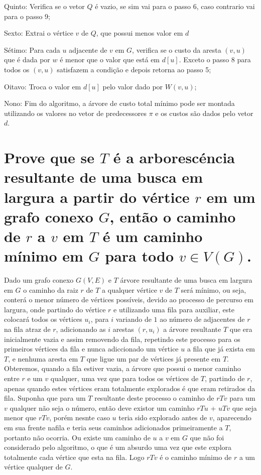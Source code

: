 \documentclass[final,3p,12pt]{elsarticle}
\begin{document}
			Quinto:
			Verifica se o vetor $Q$ é vazio, se sim vai para o passo 6, caso contrario vai para o passo 9;
			
			Sexto:
			Extrai o vértice $v$ de $Q$, que possui menos valor em $d$

			Sétimo:
			Para cada $u$ adjacente de $v$ em $G$, verifica se o custo da aresta $(v,u)$ que é dada por $w$ é menor que o valor que está em $d[u]$. Exceto o passo 8 para todos os $(v,u)$ satisfazem a condição e depois retorna ao passo 5;

			Oitavo:
			Troca o valor em $d[u]$ pelo valor dado por $W(v,u)$;

			Nono:
			Fim do algoritmo, a árvore de custo total mínimo pode ser montada utilizando os valores no vetor de predecessores $\pi$ e os custos são dados pelo vetor $d$.

\section{Prove que se $T$ é a arborescéncia resultante de uma busca em largura a partir do vértice $r$ em um grafo conexo $G$, então o caminho de $r$ a $v$ em $T$ é um caminho mínimo em $G$ para todo $v \in V(G)$.}
	\label{S:4}
		Dado um grafo conexo $G(V,E)$ e $T$ árvore resultante de uma busca em largura em $G$ o caminho da raiz $r$ de $T$ a qualquer vértice $v$ de $T$ será mínimo, ou seja, conterá o menor número de vértices possíveis, devido ao processo de percurso em largura, onde partindo do vértice $r$ e utilizando uma fila para auxiliar, este colocará todos os vértices $u_i$, para $i$ variando de $1$ ao número de adjacentes de $r$ na fila atraz de $r$, adicionando as $i$ arestas $(r,u_i)$ a árvore resultante $T$ que era inicialmente vazia e assim removendo da fila, repetindo este processo para os primeiros vértices da fila e nunca adiccionado um vértice $u$ a fila que já exista em $T$, e nenhuma aresta em $T$ que ligue um par de vértices já presente em $T$. Obteremos, quando a fila estiver vazia, a árvore que possui o menor caminho entre $r$ e um $v$ qualquer, uma vez que para todos os vértices de $T$, partindo de $r$, apenas quando estes vértices eram totalmente explorados é que eram retirados da fila.
		Suponha que para um $T$ resultante deste processo o caminho de $rTv$ para um $v$ qualquer não seja o número, então deve existor um caminho $rTu$ + $uTv$ que seja menor que $rTv$, porém nesnte caso $u$ teria sido explorado antes de $v$, aparecendo em sua frente nafila e teria seus caminhos adicionados primeiramente a $T$, portanto não ocorria. Ou existe um caminho de $u$ a $v$ em $G$ que não foi considerado pelo algoritmo, o que é um absurdo uma vez que este explora totalmente cada vértice que esta na fila. Logo $rTv$ é o caminho mínimo de $r$ a um vértice qualquer de $G$.
\end{document}
